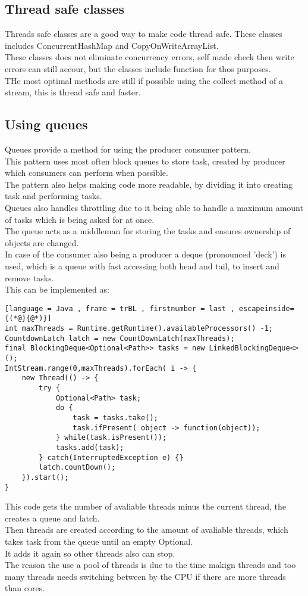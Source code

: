 \documentclass[12pt, a4paper]{article}
\begin{document}
		\subsection{Thread safe classes}
			Threads safe classes are a good way to make code thread safe. These classes includes ConcurrentHashMap and CopyOnWriteArrayList.\\
			These classes does not eliminate concurrency errors, self made check then write errors can still accour, but the classes include function for thos purposes.\\
			THe most optimal methods are still if possible using the collect method of a stream, this is thread safe and faster.
		\subsection{Using queues}
			Queues provide a method for using the producer consumer pattern.\\
			This pattern uses most often block queues to store task, created by producer which consumers can perform when possible.\\
			The pattern also helps making code more readable, by dividing it into creating task and performing tasks.\\
			Queues also handles throttling due to it being able to handle a maximum amount of tasks which is being asked for at once.\\
			The queue acts as a middleman for storing the tasks and ensures ownership of objects are changed.\\
			In case of the consumer also being a producer a deque (pronounced 'deck') is used, which is a queue with fast accessing both head and tail, to insert and remove tasks.\\
			This can be implemented as:
	\begin{lstlisting}[language = Java , frame = trBL , firstnumber = last , escapeinside={(*@}{@*)}]
int maxThreads = Runtime.getRuntime().availableProcessors() -1;
CountdownLatch latch = new CountDownLatch(maxThreads);
final BlockingDeque<Optional<Path>> tasks = new LinkedBlockingDeque<>();
IntStream.range(0,maxThreads).forEach( i -> {
	new Thread(() -> {
		try {
			Optional<Path> task;
			do {
				task = tasks.take();
				task.ifPresent( object -> function(object));
			} while(task.isPresent());
			tasks.add(task);
		} catch(InterruptedException e) {}
		latch.countDown();
	}).start();
}
\end{lstlisting}
			This code gets the number of avaliable threads minus the current thread, the creates a queue and latch.\\
			Then threads are created according to the amount of avaliable threads, which takes task from the queue until an empty Optional.\\
			It adds it again so other threads also can stop.\\
			The reason the use a pool of threads is due to the time makign threads and too many threads needs switching between by the CPU if there are more threads than cores.\\
\end{document}
